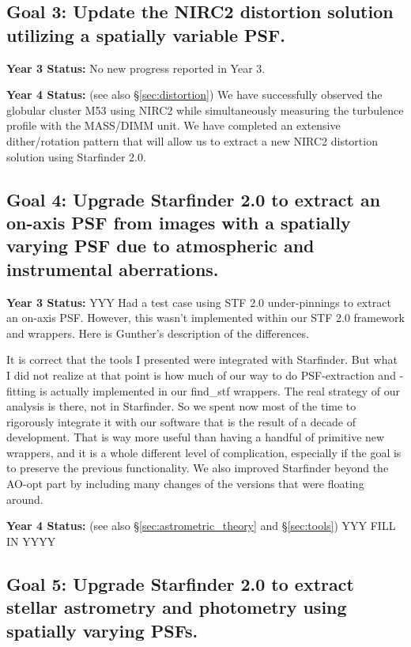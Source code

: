 \subsection{Goal 3: Update the NIRC2 distortion solution utilizing a spatially
  variable PSF.}

\noindent
\textbf{Year 3 Status:}
No new progress reported in Year 3.

\noindent
\textbf{Year 4 Status:} (see also \S\ref{sec:distortion})
We have successfully observed the globular cluster M53 using NIRC2
while simultaneously measuring the turbulence profile with the
MASS/DIMM unit. We have completed an extensive dither/rotation pattern
that will allow us to extract a new NIRC2 distortion solution using
Starfinder 2.0.


\subsection{Goal 4: Upgrade Starfinder 2.0 to extract an on-axis PSF from images with
  a spatially varying PSF due to atmospheric and instrumental aberrations.}

\noindent
\textbf{Year 3 Status:} 
YYY Had a test case using STF 2.0 under-pinnings to extract an
on-axis PSF. However, this wasn't implemented within our STF 2.0
framework and wrappers. Here is Gunther's description of the
differences. 

It is correct that the tools I presented were integrated with
Starfinder. But what I did not realize at that point is how much of
our way to do PSF-extraction and -fitting is actually implemented in
our find\_stf wrappers. The real strategy of our analysis is there,
not in Starfinder. So we spent now most of the time to rigorously
integrate it with our software that is the result of a decade of
development. That is way more useful than having a handful of
primitive new wrappers, and it is a whole different level of
complication, especially if the goal is to preserve the previous
functionality. We also improved Starfinder beyond the AO-opt part by
including many changes of the versions that were floating around. 

\noindent
\textbf{Year 4 Status:}
(see also \S\ref{sec:astrometric_theory} and \S\ref{sec:tools})
YYY FILL IN YYYY

\subsection{Goal 5: Upgrade Starfinder 2.0 to extract stellar astrometry and
  photometry using spatially varying PSFs.}

